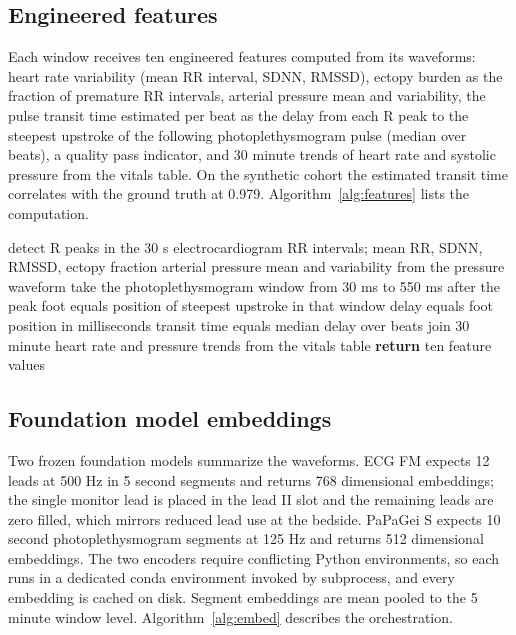 \documentclass[11pt]{article}
\begin{document}
\subsection{Engineered features}
Each window receives ten engineered features computed from its waveforms: heart
rate variability (mean RR interval, SDNN, RMSSD), ectopy burden as the fraction of
premature RR intervals, arterial pressure mean and variability, the pulse transit
time estimated per beat as the delay from each R peak to the steepest upstroke of
the following photoplethysmogram pulse (median over beats), a quality pass
indicator, and 30 minute trends of heart rate and systolic pressure from the
vitals table. On the synthetic cohort the estimated transit time correlates with
the ground truth at 0.979. Algorithm~\ref{alg:features} lists the computation.

\begin{algorithm}[t]
\caption{Engineered features per window}
\label{alg:features}
\begin{algorithmic}[1]
\State detect R peaks in the 30 s electrocardiogram
\State RR intervals; mean RR, SDNN, RMSSD, ectopy fraction
\State arterial pressure mean and variability from the pressure waveform
    \State take the photoplethysmogram window from 30 ms to 550 ms after the peak
    \State foot equals position of steepest upstroke in that window
    \State delay equals foot position in milliseconds
\EndFor
\State transit time equals median delay over beats
\State join 30 minute heart rate and pressure trends from the vitals table
\State \textbf{return} ten feature values
\end{algorithmic}
\end{algorithm}

\subsection{Foundation model embeddings}
Two frozen foundation models summarize the waveforms. ECG FM expects 12 leads at
500 Hz in 5 second segments and returns 768 dimensional embeddings; the single
monitor lead is placed in the lead II slot and the remaining leads are zero
filled, which mirrors reduced lead use at the bedside. PaPaGei S expects
10 second photoplethysmogram segments at 125 Hz and returns 512 dimensional
embeddings. The two encoders require conflicting Python environments, so each runs
in a dedicated conda environment invoked by subprocess, and every embedding is
cached on disk. Segment embeddings are mean pooled to the 5 minute window level.
Algorithm~\ref{alg:embed} describes the orchestration.
\end{document}
